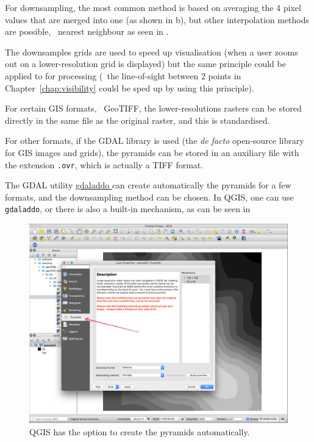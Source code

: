 %

For downsampling, the most common method is based on averaging the 4 pixel values that are merged into one (as shown in b), but other interpolation methods are possible, \eg\ nearest neighbour as seen in .

%

The downsamples grids are used to speed up visualisation (when a user zooms out on a lower-resolution grid is displayed) but the same principle could be applied to for processing (\eg\ the line-of-sight between 2 points in Chapter~\ref{chap:visibility} could be sped up by using this principle).

\begin{floatbox}
\begin{kaobox-practice}[frametitle=\faCog\ How does it work in practice?]
  For certain GIS formats, \eg\ GeoTIFF, the lower-resolutions rasters can be stored directly in the same file as the original raster, and this is standardised.

  For other formats, if the GDAL library is used (the \emph{de facto} open-source library for GIS images and grids), the pyramids can be stored in an auxiliary file with the extension \texttt{.ovr}, which is actually a TIFF format.

  The GDAL utility \href{https://www.gdal.org/gdaladdo.html}{gdaladdo \faExternalLink} can create automatically the pyramids for a few formats, and the downsampling method can be chosen.
  In QGIS, one can use \texttt{gdaladdo}, or there is also a built-in mechanism, as can be seen in 
\end{kaobox-practice}
\end{floatbox}

\begin{figure}
  \centering
  \includegraphics[width=\linewidth]{figs/qgis}
  \caption{QGIS has the option to create the pyramids automatically.}%
%
\end{figure}



